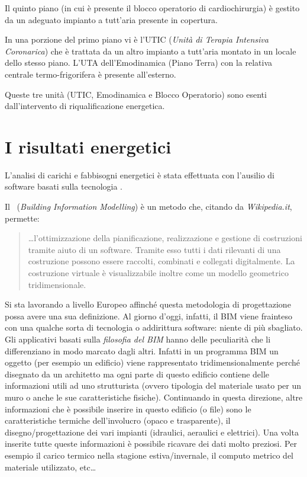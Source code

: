 Il quinto piano (in cui è presente il blocco operatorio di cardiochirurgia) è gestito da un adeguato impianto a tutt'aria presente in copertura.

In una porzione del primo piano vi è l'UTIC (\emph{Unità di Terapia Intensiva Coronarica}) che è trattata da un altro impianto a tutt'aria montato in un locale dello stesso piano. L'UTA dell'Emodinamica (Piano Terra) con la relativa centrale termo-frigorifera è presente all'esterno.

Queste tre unità (UTIC, Emodinamica e Blocco Operatorio) sono esenti dall'intervento di riqualificazione energetica.
\section{I risultati energetici}
L'analisi di carichi e fabbisogni energetici è stata effettuata con l'ausilio di software basati sulla tecnologia \bim.

Il \bim\ (\emph{Building Information Modelling}) è un metodo che, citando da \textit{Wikipedia.it}, permette:
\begin{quote}
	 \dots l'ottimizzazione della pianificazione, realizzazione e gestione di costruzioni tramite aiuto di un software. Tramite esso tutti i dati rilevanti di una costruzione possono essere raccolti, combinati e collegati digitalmente. La costruzione virtuale è visualizzabile inoltre come un modello geometrico tridimensionale.
\end{quote}
Si sta lavorando a livello Europeo affinché questa metodologia di progettazione possa avere una sua definizione. Al giorno d'oggi, infatti, il BIM viene frainteso con una qualche sorta di tecnologia o addirittura software: niente di più sbagliato. Gli applicativi basati sulla \emph{filosofia del BIM} hanno delle peculiarità che li differenziano in modo marcato dagli altri. Infatti in un programma BIM un oggetto (per esempio un edificio) viene rappresentato tridimensionalmente perché disegnato da un architetto ma ogni parte di questo edificio contiene delle informazioni utili ad uno strutturista (ovvero tipologia del materiale usato per un muro o anche le sue caratteristiche fisiche). Continuando in questa direzione, altre informazioni che è possibile inserire in questo edificio (o file) sono le caratteristiche termiche dell'involucro (opaco e trasparente), il disegno/progettazione dei vari impianti (idraulici, aeraulici e elettrici). Una volta inserite tutte queste informazioni è possibile ricavare dei dati molto preziosi. Per esempio il carico termico nella stagione estiva/invernale, il computo metrico del materiale utilizzato, etc\dots

